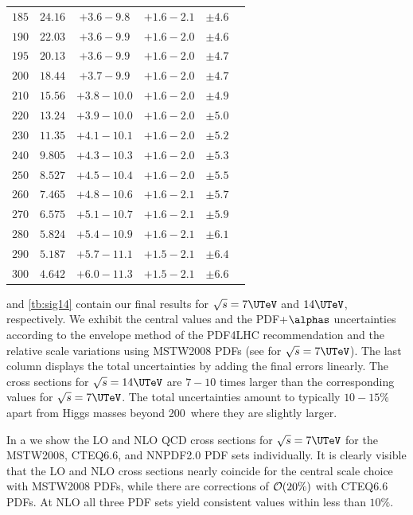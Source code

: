 \begin{table}[p]
\begin{center}
\begin{tabular}{cccccc}
$185 $&$ 24.16    $&$ +3.6  -\!9.8  $&$ +1.6  -\!2.1 $&$ \pm 4.6 $\\
$190 $&$ 22.03    $&$ +3.6  -\!9.9  $&$ +1.6  -\!2.0 $&$ \pm 4.6 $\\
$195 $&$ 20.13    $&$ +3.6  -\!9.9  $&$ +1.6  -\!2.0 $&$ \pm 4.7 $\\
$200 $&$ 18.44    $&$ +3.7  -\!9.9  $&$ +1.6  -\!2.0 $&$ \pm 4.7 $\\
$210 $&$ 15.56    $&$ +3.8  -\!10.0 $&$ +1.6  -\!2.0 $&$ \pm 4.9 $\\
$220 $&$ 13.24    $&$ +3.9  -\!10.0 $&$ +1.6  -\!2.0 $&$ \pm 5.0 $\\
$230 $&$ 11.35    $&$ +4.1  -\!10.1 $&$ +1.6  -\!2.0 $&$ \pm 5.2 $\\
$240 $&$ 9.805    $&$ +4.3  -\!10.3 $&$ +1.6  -\!2.0 $&$ \pm 5.3 $\\
$250 $&$ 8.527    $&$ +4.5  -\!10.4 $&$ +1.6  -\!2.0 $&$ \pm 5.5 $\\
$260 $&$ 7.465    $&$ +4.8  -\!10.6 $&$ +1.6  -\!2.1 $&$ \pm 5.7 $\\
$270 $&$ 6.575    $&$ +5.1  -\!10.7 $&$ +1.6  -\!2.1 $&$ \pm 5.9 $\\
$280 $&$ 5.824    $&$ +5.4  -\!10.9 $&$ +1.6  -\!2.1 $&$ \pm 6.1 $\\
$290 $&$ 5.187    $&$ +5.7  -\!11.1 $&$ +1.5  -\!2.1 $&$ \pm 6.4 $\\
$300 $&$ 4.642    $&$ +6.0  -\!11.3 $&$ +1.5  -\!2.1 $&$ \pm 6.6 $\\
\hline
 \end{tabular}
 \end{center}
\end{table}

 and \ref{tb:sig14} contain our final results for
$\sqrt{s}=7\UTeV$ and $14\UTeV$, respectively. We exhibit the central
values and the PDF+$\alphas$ uncertainties according to the envelope
method of the PDF4LHC recommendation and the relative scale variations
using MSTW2008 PDFs (see  for $\sqrt{s}=7\UTeV$). The
last column displays the total uncertainties by adding the final errors
linearly. The cross sections for $\sqrt{s}=14\UTeV$ are $7{-}10$ times
larger than the corresponding values for $\sqrt{s}=7\UTeV$. The total
uncertainties amount to typically $10{-}15\%$ apart from Higgs masses
beyond 200\UGeV\ where they are slightly larger.

In a we show the LO and NLO QCD cross sections for
$\sqrt{s}=7\UTeV$ for the MSTW2008, CTEQ6.6, and NNPDF2.0 PDF sets
individually. It is clearly visible that the LO and NLO cross sections
nearly coincide for the central scale choice with MSTW2008 PDFs, while
there are corrections of ${\cal O}(20\%)$ with CTEQ6.6 PDFs. At NLO all
three PDF sets yield consistent values within less than $10\%$.

